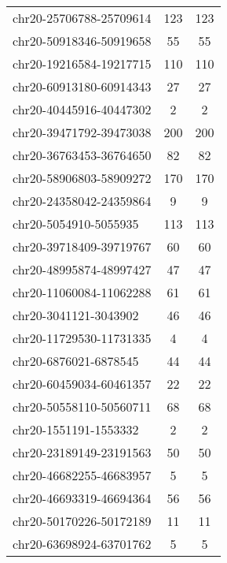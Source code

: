 \begin{longtable}{lSS}
	chr20-25706788-25709614 & 123  & 123                             \\
	chr20-50918346-50919658 & 55   & 55                              \\
	chr20-19216584-19217715 & 110  & 110                             \\
	chr20-60913180-60914343 & 27   & 27                              \\
	chr20-40445916-40447302 & 2    & 2                               \\
	chr20-39471792-39473038 & 200  & 200                             \\
	chr20-36763453-36764650 & 82   & 82                              \\
	chr20-58906803-58909272 & 170  & 170                             \\
	chr20-24358042-24359864 & 9    & 9                               \\
	chr20-5054910-5055935   & 113  & 113                             \\
	chr20-39718409-39719767 & 60   & 60                              \\
	chr20-48995874-48997427 & 47   & 47                              \\
	chr20-11060084-11062288 & 61   & 61                              \\
	chr20-3041121-3043902   & 46   & 46                              \\
	chr20-11729530-11731335 & 4    & 4                               \\
	chr20-6876021-6878545   & 44   & 44                              \\
	chr20-60459034-60461357 & 22   & 22                              \\
	chr20-50558110-50560711 & 68   & 68                              \\
	chr20-1551191-1553332   & 2    & 2                               \\
	chr20-23189149-23191563 & 50   & 50                              \\
	chr20-46682255-46683957 & 5    & 5                               \\
	chr20-46693319-46694364 & 56   & 56                              \\
	chr20-50170226-50172189 & 11   & 11                              \\
	chr20-63698924-63701762 & 5    & 5                               \\

\end{longtable}
